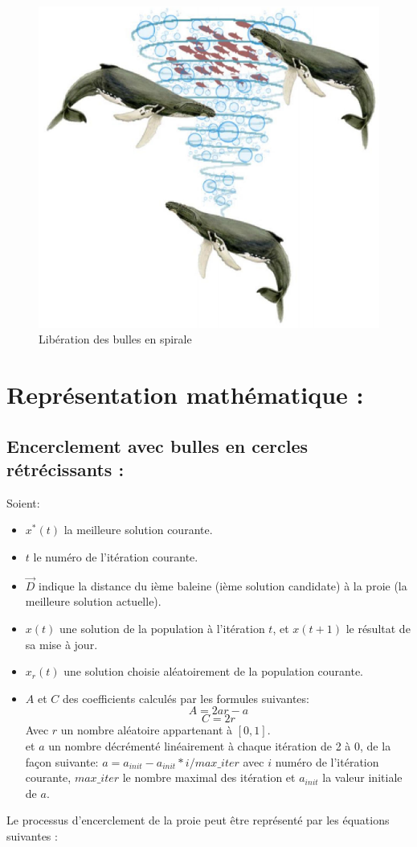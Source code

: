 \documentclass[12pt]{article}
\begin{document}
\begin{figure}[H] 
    \includegraphics[width=\linewidth]{../figures/spiral.png}
    \caption{Libération des bulles en spirale}
\end{figure}

\section{Représentation mathématique :}
\subsection{Encerclement avec bulles en cercles rétrécissants :}
Soient:
\begin{itemize}
    \item \(x^*(t)\) la meilleure solution courante.
    \item \(t\) le numéro de l'itération courante.
    \item \(\vec{D}\) indique la distance du ième baleine (ième solution candidate) à la proie (la meilleure solution actuelle).
    \item \(x(t)\) une solution de la population à l'itération \(t\), et \(x(t+1)\) le résultat de sa mise à jour.
    \item \(x_r(t)\) une solution choisie aléatoirement de la population courante.
    \item \(A\) et \(C\) des coefficients calculés par les formules suivantes:
    \[A = 2ar-a\] 
    \[C = 2r\] 
    Avec \(r\) un nombre aléatoire appartenant à \([0,1]\).
    \\ et \(a\) un nombre décrémenté linéairement à chaque itération de 2 à 0, de la façon suivante:
    \(a =  a_{init} - a_{init}*i/max\_iter\) avec \(i\) numéro de l’itération courante, \(max\_iter\) le nombre maximal des itération et \(a_{init}\) la valeur initiale de \(a\).
\end{itemize}
Le processus d’encerclement de la proie peut être représenté par les équations suivantes :
\end{document}
